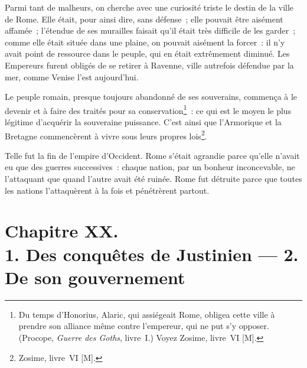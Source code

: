 \documentclass[french,twoside]{book} %
\newcommand\chapteropen{} %
\newcommand\chapterclose{} %
\begin{document}
Parmi tant de malheurs, on cherche avec une curiosité triste le destin de la ville de Rome. Elle était, pour ainsi dire, sans défense ; elle pouvait être aisément affamée ; l’étendue de ses murailles faisait qu’il était très difficile de les garder ; comme elle était située dans une plaine, on pouvait aisément la forcer : il n’y avait point de ressource dans le peuple, qui en était extrêmement diminué. Les Empereurs furent obligés de se retirer à Ravenne, ville autrefois défendue par la mer, comme Venise l’est aujourd’hui.\par
Le peuple romain, presque toujours abandonné de ses souverains, commença à le devenir et à faire des traités pour sa conservation\footnote{Du temps d’Honorius, Alaric, qui assiégeait Rome, obligea cette ville à prendre son alliance même contre l’empereur, qui ne put s’y opposer. (Procope, {\itshape Guerre des Goths}, livre I.) Voyez Zosime, livre VI [M].} : ce qui est le moyen le plus légitime d’acquérir la souveraine puissance. C’est ainsi que l’Armorique et la Bretagne commencèrent à vivre sous leurs propres lois\footnote{Zosime, livre VI [M].}.\par
Telle fut la fin de l’empire d’Occident. Rome s’était agrandie parce qu’elle n’avait eu que des guerres successives : chaque nation, par un bonheur inconcevable, ne l’attaquant que quand l’autre avait été ruinée. Rome fut détruite parce que toutes les nations l’attaquèrent à la fois et pénétrèrent partout.
\chapterclose


\chapteropen
\chapter[{Chapitre XX. 1. Des conquêtes de Justinien — 2. De son gouvernement}]{Chapitre XX. \\
1. Des conquêtes de Justinien — 2. De son gouvernement}
\label{considérations\_Romains\_chap\_20}\renewcommand{\leftmark}{Chapitre XX. \\
1. Des conquêtes de Justinien — 2. De son gouvernement}
\end{document}

